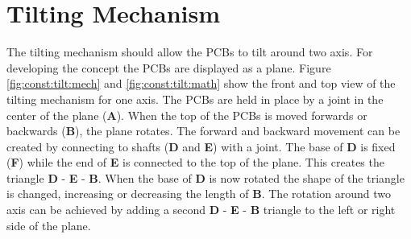 \section{Tilting Mechanism}\label{sec:const:tilt}



The tilting mechanism should allow the PCBs to tilt around two axis. For developing the concept the PCBs are displayed as a plane. Figure \ref{fig:const:tilt:mech} and \ref{fig:const:tilt:math} show the front and top view of the tilting mechanism for one axis.\p
%
The PCBs are held in place by a joint in the center of the plane (\textbf{A}). When the top of the PCBs is moved forwards or backwards (\textbf{B}), the plane rotates. The forward and backward movement can be created by connecting to shafts (\textbf{D} and \textbf{E}) with a joint. The base of \textbf{D} is fixed (\textbf{F}) while the end of \textbf{E} is connected to the top of the plane. This creates the triangle \textbf{D} - \textbf{E} - \textbf{B}. When the base of \textbf{D} is now rotated the shape of the triangle is changed, increasing or decreasing the length of \textbf{B}.
The rotation around two axis can be achieved by adding a second \textbf{D} - \textbf{E} - \textbf{B} triangle to the left or right side of the plane.
%

